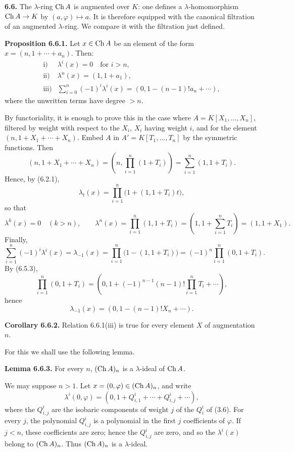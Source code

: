 \documentclass[11pt]{article}
\begin{document}
\textbf{6.6.} The \(\lambda\)-ring \(\operatorname{Ch} A\) is augmented over \(K\): one defines a \(\lambda\)-homomorphism \(\operatorname{Ch} A\to K\) by \((a,\varphi)\mapsto a\). It is therefore equipped with the canonical filtration of an augmented \(\lambda\)-ring. We compare it with the filtration just defined.

\textbf{Proposition 6.6.1.} Let \(x\in\operatorname{Ch} A\) be an element of the form \(x=(n,1+\cdots+a_n)\). Then:
\[
\begin{array}{ll}
\text{i)}& \lambda^i(x)=0\quad\text{for }i>n,\\[0.3em]
\text{ii)}& \lambda^n(x)=(1,1+a_1),\\[0.3em]
\text{iii)}& \displaystyle\sum_{i=0}^n(-1)^i\lambda^i(x)
       =(0,1-(n-1)!a_n+\cdots),
\end{array}
\]
where the unwritten terms have degree \(>n\).

By functoriality, it is enough to prove this in the case where
\(A=K[X_1,\ldots,X_n]\), filtered by weight with respect to the \(X_i\), \(X_i\) having weight \(i\), and for the element \((n,1+X_1+\cdots+X_n)\). Embed \(A\) in \(A'=K[T_1,\ldots,T_n]\) by the symmetric functions. Then
\[
 (n,1+X_1+\cdots+X_n)
 =
 \left(n,\prod_{i=1}^n(1+T_i)\right)
 =
 \sum_{i=1}^n(1,1+T_i).
\]
Hence, by (6.2.1),
\[
  \lambda_t(x)=\prod_{i=1}^n\bigl(1+(1,1+T_i)t\bigr),
\]
so that
\[
  \lambda^k(x)=0\quad(k>n),\qquad
  \lambda^n(x)=\prod_{i=1}^n(1,1+T_i)
   =\left(1,1+\sum_{i=1}^nT_i\right)=(1,1+X_1).
\]
Finally,
\[
  \sum_{i=1}^n(-1)^i\lambda^i(x)=\lambda_{-1}(x)
  =\prod_{i=1}^n\bigl(1-(1,1+T_i)\bigr)
  =(-1)^n\prod_{i=1}^n(0,1+T_i).
\]
By (6.5.3),
\[
  \prod_{i=1}^n(0,1+T_i)
  =
  \left(0,1+(-1)^{n-1}(n-1)!\prod_{i=1}^nT_i+\cdots\right),
\]
hence
\[
  \lambda_{-1}(x)=(0,1-(n-1)!X_n+\cdots).
\]

\textbf{Corollary 6.6.2.} Relation 6.6.1(iii) is true for every element \(X\) of augmentation \(n\).

For this we shall use the following lemma.

\textbf{Lemma 6.6.3.} For every \(n\), \((\operatorname{Ch} A)_n\) is a \(\lambda\)-ideal of \(\operatorname{Ch} A\).

We may suppose \(n>1\). Let \(x=(0,\varphi)\in(\operatorname{Ch} A)_n\), and write
\[
  \lambda^i(0,\varphi)=(0,1+Q^i_{i,1}+\cdots+Q^i_{i,j}+\cdots),
\]
where the \(Q^i_{i,j}\) are the isobaric components of weight \(j\) of the \(Q^i_i\) of (3.6). For every \(j\), the polynomial \(Q^i_{i,j}\) is a polynomial in the first \(j\) coefficients of \(\varphi\). If \(j<n\), these coefficients are zero; hence the \(Q^i_{i,j}\) are zero, and so the \(\lambda^i(x)\) belong to \((\operatorname{Ch} A)_n\). Thus \((\operatorname{Ch} A)_n\) is a \(\lambda\)-ideal.
\end{document}
